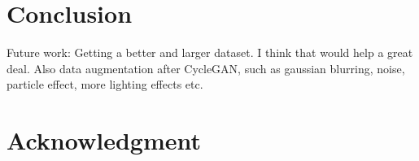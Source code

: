 \documentclass[letterpaper, 10pt, conference]{ieeeconf}
\begin{document}
\section{Conclusion}

Future work: Getting a better and larger dataset. I think that would help a great deal. Also data augmentation
after CycleGAN, such as gaussian blurring, noise, particle effect, more lighting effects etc.

\section*{Acknowledgment}



\end{document}
